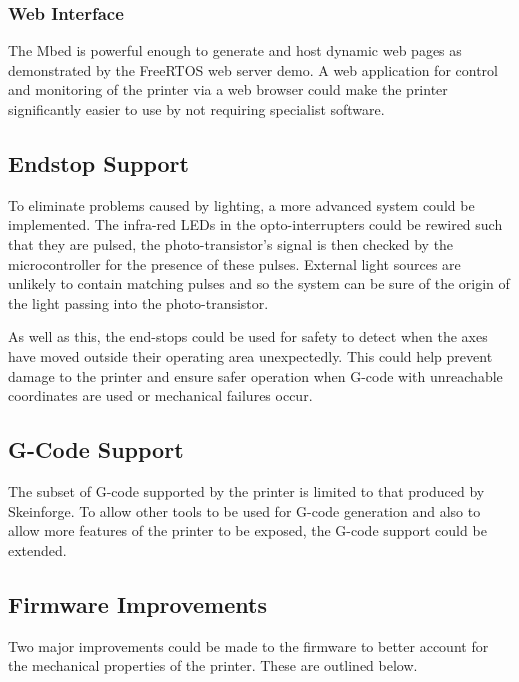 			\subsubsection{Web Interface}
				
				The Mbed is powerful enough to generate and host dynamic web pages as
				demonstrated by the FreeRTOS web server demo. A web application for
				control and monitoring of the printer via a web browser could make the
				printer significantly easier to use by not requiring specialist
				software.
		
		\subsection{Endstop Support}
			
			\label{sec:future_endstop}
			
			To eliminate problems caused by lighting, a more advanced system could be
			implemented.  The infra-red LEDs in the opto-interrupters could be rewired
			such that they are pulsed, the photo-transistor's signal is then checked
			by the microcontroller for the presence of these pulses. External light
			sources are unlikely to contain matching pulses and so the system can be
			sure of the origin of the light passing into the photo-transistor.
			
			As well as this, the end-stops could be used for safety to detect when the
			axes have moved outside their operating area unexpectedly. This could help
			prevent damage to the printer and ensure safer operation when G-code with
			unreachable coordinates are used or mechanical failures occur.
			
		\subsection{G-Code Support}
			
			The subset of G-code supported by the printer is limited to that produced
			by Skeinforge. To allow other tools to be used for G-code generation and
			also to allow more features of the printer to be exposed, the G-code
			support could be extended.
		
		\subsection{Firmware Improvements}
			
			\label{sec:future_firmware}
			
			Two major improvements could be made to the firmware to better account for
			the mechanical properties of the printer. These are outlined below.
			
